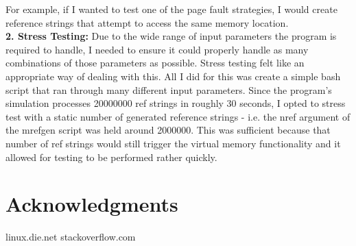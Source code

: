 \documentclass{article}
\begin{document}
\noindent
For example, if I wanted to test one of the page fault strategies,
I would create reference strings that attempt to access the same memory location. \\

\noindent
\textbf{2. Stress Testing:}
Due to the wide range of input parameters the program is required to handle, I needed
to ensure it could properly handle as many combinations of those parameters as possible.
Stress testing felt like an appropriate way of dealing with this.
All I did for this was create a simple bash script that ran through many different input
parameters. Since the program's simulation processes 20000000 ref strings in roughly
30 seconds, I opted to stress test with a static number of generated reference strings -
i.e. the nref argument of the mrefgen script was held around 2000000. This was sufficient
because that number of ref strings would still trigger the virtual memory functionality
and it allowed for testing to be performed rather quickly. \\

\section{Acknowledgments}
linux.die.net
stackoverflow.com
\end{document}
